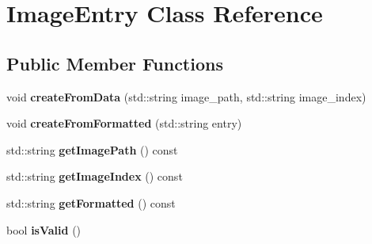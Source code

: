 \hypertarget{class_image_entry}{}\section{Image\+Entry Class Reference}
\label{class_image_entry}
\subsection*{Public Member Functions}
\begin{DoxyCompactItemize}
\item 
\hypertarget{class_image_entry_a8e54a47819f25e6ee7e76273503b8744}{}void {\bfseries create\+From\+Data} (std\+::string image\+\_\+path, std\+::string image\+\_\+index)\label{class_image_entry_a8e54a47819f25e6ee7e76273503b8744}

\item 
\hypertarget{class_image_entry_afe824b1530ab4b33ece3132b2e0a78e8}{}void {\bfseries create\+From\+Formatted} (std\+::string entry)\label{class_image_entry_afe824b1530ab4b33ece3132b2e0a78e8}

\item 
\hypertarget{class_image_entry_acc882273f2d2c87d742f01efc5807bf5}{}std\+::string {\bfseries get\+Image\+Path} () const \label{class_image_entry_acc882273f2d2c87d742f01efc5807bf5}

\item 
\hypertarget{class_image_entry_a4a621dcaffe09aee7ada966d46705cbc}{}std\+::string {\bfseries get\+Image\+Index} () const \label{class_image_entry_a4a621dcaffe09aee7ada966d46705cbc}

\item 
\hypertarget{class_image_entry_ac7d77251bdb581de36cd3dae3d9e0c1d}{}std\+::string {\bfseries get\+Formatted} () const \label{class_image_entry_ac7d77251bdb581de36cd3dae3d9e0c1d}

\item 
\hypertarget{class_image_entry_acd053af5a4af1443443e3863f1df9b37}{}bool {\bfseries is\+Valid} ()\label{class_image_entry_acd053af5a4af1443443e3863f1df9b37}

\end{DoxyCompactItemize}
